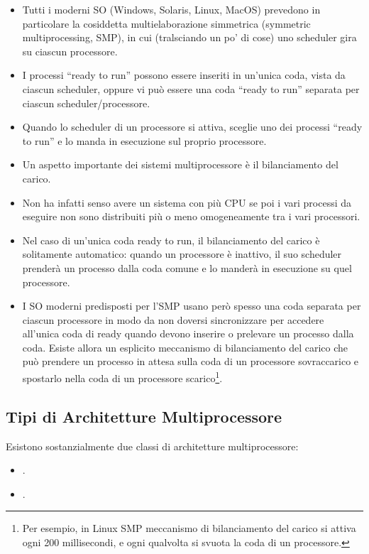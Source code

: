 \begin{itemize}
  \item Tutti i moderni SO (Windows, Solaris, Linux, MacOS) prevedono in
particolare la cosiddetta multielaborazione simmetrica (symmetric
multiprocessing, SMP), in cui (tralsciando un po’ di cose) uno
scheduler gira su ciascun processore. 
\item I processi “ready to run” possono essere inseriti in un’unica coda,
vista da ciascun scheduler, oppure vi può essere una coda “ready to
run” separata per ciascun scheduler/processore. 
\item Quando lo scheduler di un processore si attiva, sceglie uno dei
processi “ready to run” e lo manda in esecuzione sul proprio
processore.
\item Un aspetto importante dei sistemi multiprocessore è il bilanciamento
del carico.
\item Non ha infatti senso avere un sistema con più CPU se poi i vari
processi da eseguire non sono distribuiti più o meno omogeneamente
tra i vari processori. 
\item Nel caso di un’unica coda ready to run, il bilanciamento del carico
è solitamente automatico: quando un processore è inattivo, il suo
scheduler prenderà un processo dalla coda comune e lo manderà in
esecuzione su quel processore.
\item I SO moderni predisposti per l’SMP usano però spesso una coda
separata per ciascun processore in modo da non doversi sincronizzare
per accedere all’unica coda di ready quando devono inserire o
prelevare un processo dalla coda. Esiste allora un esplicito meccanismo di bilanciamento del carico
che può prendere un processo in attesa sulla coda di un processore
sovraccarico e spostarlo nella coda di un processore scarico\footnote{Per esempio, in Linux SMP meccanismo di bilanciamento del carico
si attiva ogni 200 millisecondi, e ogni qualvolta si svuota la coda di
un processore.}.
\end{itemize}

\subsection{Tipi di Architetture Multiprocessore}

Esistono sostanzialmente due classi di architetture multiprocessore: 

\begin{itemize}
  \item {}. 
  \item {}.
\end{itemize}

